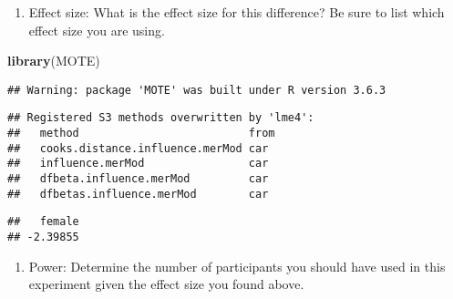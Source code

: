 \documentclass[
]{article}
\newenvironment{Shaded}{\begin{snugshade}}{\end{snugshade}}
\newcommand{\DataTypeTok}[1]{\textcolor[rgb]{0.13,0.29,0.53}{#1}}
\newcommand{\DecValTok}[1]{\textcolor[rgb]{0.00,0.00,0.81}{#1}}
\newcommand{\FloatTok}[1]{\textcolor[rgb]{0.00,0.00,0.81}{#1}}
\newcommand{\KeywordTok}[1]{\textcolor[rgb]{0.13,0.29,0.53}{\textbf{#1}}}
\newcommand{\NormalTok}[1]{#1}
\newcommand{\OperatorTok}[1]{\textcolor[rgb]{0.81,0.36,0.00}{\textbf{#1}}}
\newcommand{\StringTok}[1]{\textcolor[rgb]{0.31,0.60,0.02}{#1}}
\providecommand{\tightlist}{%
  \setlength{\itemsep}{0pt}\setlength{\parskip}{0pt}}
\begin{document}
\begin{enumerate}
\def\labelenumi{\arabic{enumi})}
\setcounter{enumi}{1}
\tightlist
\item
  Effect size: What is the effect size for this difference? Be sure to
  list which effect size you are using.
\end{enumerate}

\begin{Shaded}
\begin{Highlighting}[]
\KeywordTok{library}\NormalTok{(MOTE)}
\end{Highlighting}
\end{Shaded}

\begin{verbatim}
## Warning: package 'MOTE' was built under R version 3.6.3
\end{verbatim}

\begin{verbatim}
## Registered S3 methods overwritten by 'lme4':
##   method                          from
##   cooks.distance.influence.merMod car 
##   influence.merMod                car 
##   dfbeta.influence.merMod         car 
##   dfbetas.influence.merMod        car
\end{verbatim}

\begin{Shaded}
\end{Shaded}

\begin{verbatim}
##   female 
## -2.39855
\end{verbatim}

\begin{enumerate}
\def\labelenumi{\arabic{enumi})}
\setcounter{enumi}{2}
\tightlist
\item
  Power: Determine the number of participants you should have used in
  this experiment given the effect size you found above.
\end{enumerate}
\end{document}
